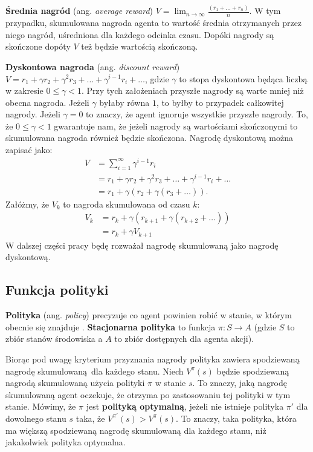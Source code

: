 \documentclass[a4paper, 12pt,twoside]{report}
\begin{document}
\textbf{Średnia nagród} (ang. \textit{average reward}) $V =
\lim_{n\to\infty}\frac{(r_1 + \dots + r_n)}{n}$. W tym przypadku, skumulowana
nagroda agenta to wartość średnia otrzymanych przez niego nagród, uśredniona
dla każdego odcinka czasu. Dopóki nagrody są skończone dopóty $V$ też będzie
wartością skończoną.

\textbf{Dyskontowa nagroda} (ang. \textit{discount reward}) $V = r_1 + \gamma
r_2 + \gamma^2 r_3 + \dots + \gamma^{i-1} r_i + \dots$, gdzie $\gamma$ to stopa
dyskontowa będąca liczbą w zakresie $0 \leq \gamma < 1$. Przy tych założeniach
przyszłe nagrody są warte mniej niż obecna nagroda. Jeżeli $\gamma$ byłaby
równa $1$, to byłby to przypadek całkowitej nagrody. Jeżeli $\gamma = 0$ to
znaczy, że agent ignoruje wszystkie przyszłe nagrody. To, że $0 \leq \gamma <
1$ gwarantuje nam, że jeżeli nagrody są wartościami skończonymi to skumulowana
nagroda również będzie skończona. Nagrodę dyskontową można zapisać jako:
\begin{equation} \label{discount_reward}
\begin{split}
	V &= \sum_{i=1}^{\infty} \gamma^{i - 1} r_i \\
	  &= r_1 + \gamma r_2 + \gamma^2 r_3 + \dots + \gamma^{i-1}r_i +\dots\\
	  &= r_1 + \gamma(r_2 +\gamma(r_3 + \dots)).
\end{split}
\end{equation}
Załóżmy, że $V_k$ to nagroda skumulowana od czasu $k$:
\begin{equation} \label{discount_reward_2}
\begin{split}
	V_k &= r_k + \gamma(r_{k+1} +\gamma(r_{k+2} + \dots))\\
	&= r_k + \gamma V_{k+1}
\end{split}
\end{equation}
W dalszej części pracy będę rozważał nagrodę skumulowaną jako nagrodę
dyskontową.

\subsection{Funkcja polityki}
\textbf{Polityka} (ang. \textit{policy}) precyzuje co agent powinien robić
w stanie, w którym obecnie się znajduje \cite{sawka_ml}.
\textbf{Stacjonarna polityka} to funkcja $\pi : S \rightarrow A$ (gdzie $S$ to
zbiór stanów środowiska a $A$ to zbiór dostępnych dla agenta akcji).

Biorąc pod uwagę kryterium przyznania nagrody polityka zawiera spodziewaną
nagrodę skumulowaną dla każdego stanu. Niech $V^{\pi}(s)$ będzie spodziewaną
nagrodą skumulowaną użycia polityki $\pi$ w stanie $s$. To znaczy, jaką nagrodę
skumulowaną agent oczekuje, że otrzyma po zastosowaniu tej polityki w tym
stanie. Mówimy, że $\pi$ jest \textbf{polityką optymalną}, jeżeli nie istnieje
polityka $\pi'$ dla dowolnego stanu $s$ taka, że $V^{\pi'}(s) > V^{\pi}(s)$. To
znaczy, taka polityka, która ma większą spodziewaną nagrodę skumulowaną dla
każdego stanu, niż jakakolwiek polityka optymalna.
\end{document}

